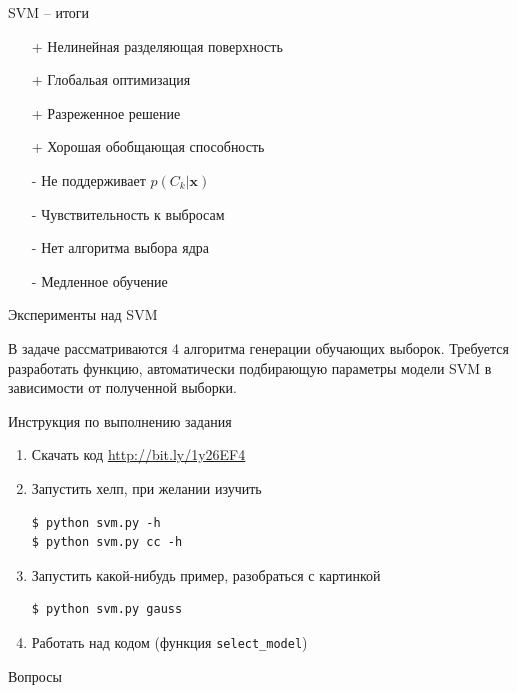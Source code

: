 \documentclass[10pt]{beamer}
\begin{document}
\begin{frame}{SVM -- итоги}

\begin{itemize}
\item[+] Нелинейная разделяющая поверхность
\item[+] Глобальая оптимизация
\item[+] Разреженное решение
\item[+] Хорошая обобщающая способность
\item[-] Не поддерживает $p(C_k | \mathbf x)$
\item[-] Чувствительность к выбросам
\item[-] Нет алгоритма выбора ядра
\item[-] Медленное обучение
\end{itemize}

\end{frame}

\begin{frame}[fragile]{Эксперименты над SVM}

В задаче рассматриваются 4 алгоритма генерации обучающих выборок. Требуется разработать функцию, автоматически подбирающую параметры модели SVM в зависимости от полученной выборки.

\begin{small}
\vspace{1em}
Инструкция по выполнению задания
\begin{enumerate}
\item Скачать код \url{http://bit.ly/1y26EF4}
\item Запустить хелп, при желании изучить
\begin{shaded}
{\color{green} \begin{verbatim}
$ python svm.py -h
$ python svm.py cc -h
\end{verbatim}}
\end{shaded}
\item Запустить какой-нибудь пример, разобраться с картинкой
\begin{shaded}
{\color{green} \begin{verbatim}
$ python svm.py gauss
\end{verbatim}}
\end{shaded}
\item Работать над кодом (функция \texttt{select\_model})
\end{enumerate}
\end{small}

\end{frame}

\begin{frame}{}

\begin{center}
\Large Вопросы
\end{center}

\end{frame}
\end{document}
